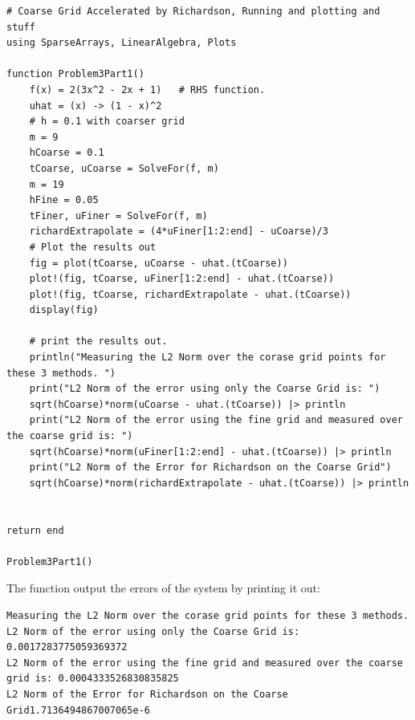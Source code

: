 \documentclass[]{article}
\begin{document}
\begin{lstlisting}
# Coarse Grid Accelerated by Richardson, Running and plotting and stuff
using SparseArrays, LinearAlgebra, Plots

function Problem3Part1()
    f(x) = 2(3x^2 - 2x + 1)   # RHS function. 
    uhat = (x) -> (1 - x)^2
    # h = 0.1 with coarser grid 
    m = 9
    hCoarse = 0.1
    tCoarse, uCoarse = SolveFor(f, m)
    m = 19
    hFine = 0.05
    tFiner, uFiner = SolveFor(f, m)
    richardExtrapolate = (4*uFiner[1:2:end] - uCoarse)/3
    # Plot the results out
    fig = plot(tCoarse, uCoarse - uhat.(tCoarse))
    plot!(fig, tCoarse, uFiner[1:2:end] - uhat.(tCoarse))
    plot!(fig, tCoarse, richardExtrapolate - uhat.(tCoarse))
    display(fig)

    # print the results out. 
    println("Measuring the L2 Norm over the corase grid points for these 3 methods. ")
    print("L2 Norm of the error using only the Coarse Grid is: ")
    sqrt(hCoarse)*norm(uCoarse - uhat.(tCoarse)) |> println
    print("L2 Norm of the error using the fine grid and measured over the coarse grid is: ")
    sqrt(hCoarse)*norm(uFiner[1:2:end] - uhat.(tCoarse)) |> println
    print("L2 Norm of the Error for Richardson on the Coarse Grid")
    sqrt(hCoarse)*norm(richardExtrapolate - uhat.(tCoarse)) |> println

    
return end

Problem3Part1()
        \end{lstlisting}
        The function output the errors of the system by printing it out: 
        \begin{tiny}
            \begin{verbatim}
Measuring the L2 Norm over the corase grid points for these 3 methods. 
L2 Norm of the error using only the Coarse Grid is: 0.0017283775059369372
L2 Norm of the error using the fine grid and measured over the coarse grid is: 0.0004333526830835825
L2 Norm of the Error for Richardson on the Coarse Grid1.7136494867007065e-6
            \end{verbatim}
        \end{tiny}
\end{document}
